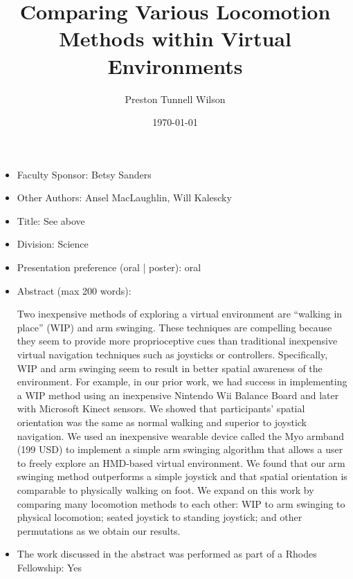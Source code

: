 \documentclass{article}
\theoremstyle{definition}
\begin{document}
\title{
  Comparing Various Locomotion Methods within Virtual Environments
}

\author{
  Preston Tunnell Wilson
}

\date{
  \today
}


\maketitle

\begin{itemize}
\item Faculty Sponsor: Betsy Sanders
\item Other Authors: Ansel MacLaughlin, Will Kalescky
\item Title: See above
\item Division: Science
\item Presentation preference (oral | poster): oral
\item Abstract (max 200 words):

  Two inexpensive methods of exploring a virtual environment are ``walking in place'' (WIP) and arm swinging.
  These techniques are compelling because
  they seem to provide more proprioceptive cues than traditional
  inexpensive virtual navigation techniques such as joysticks or controllers.
  Specifically, WIP and arm swinging seem to result in better spatial awareness of the environment.
  For example, in our prior work, we had success in implementing a WIP method
  using an inexpensive Nintendo Wii Balance Board
  and later with Microsoft Kinect sensors.
  We showed that participants' spatial orientation was the same as normal walking
  and superior to joystick navigation.
  We used an inexpensive wearable device called the Myo armband (199 USD)
  to implement a simple arm swinging algorithm that
  allows a user to freely explore an HMD-based virtual environment.
  We found that our arm swinging method outperforms a simple joystick
  and that spatial orientation is comparable to physically walking on foot.
  We expand on this work by comparing many locomotion methods to each other:
  WIP to arm swinging to physical locomotion;
  seated joystick to standing joystick;
  and other permutations as we obtain our results.

\item The work discussed in the abstract was performed as part of a Rhodes Fellowship:
  Yes
\end{itemize}
\end{document}
